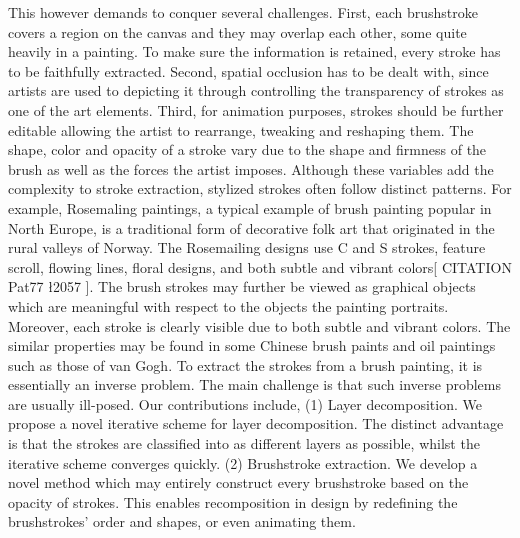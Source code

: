 This however demands to conquer several challenges. First, each brushstroke covers a region on the canvas and they may overlap each other, some quite heavily in a painting. To make sure the information is retained, every stroke has to be faithfully extracted. Second, spatial occlusion has to be dealt with, since artists are used to depicting it through controlling the transparency of strokes as one of the art elements. Third, for animation purposes, strokes should be further editable allowing the artist to rearrange, tweaking and reshaping them.
The shape, color and opacity of a stroke vary due to the shape and firmness of the brush as well as the forces the artist imposes. Although these variables add the complexity to stroke extraction, stylized strokes often follow distinct patterns. For example, Rosemaling paintings, a typical example of brush painting popular in North Europe, is a traditional form of decorative folk art that originated in the rural valleys of Norway. The Rosemailing designs use C and S strokes, feature scroll, flowing lines, floral designs, and both subtle and vibrant colors[ CITATION Pat77 \l 2057 ]. The brush strokes may further be viewed as graphical objects which are meaningful with respect to the objects the painting portraits. Moreover, each stroke is clearly visible due to both subtle and vibrant colors. The similar properties may be found in some Chinese brush paints and oil paintings such as those of van Gogh.
To extract the strokes from a brush painting, it is essentially an inverse problem. The main challenge is that such inverse problems are usually ill-posed. Our contributions include,
(1) Layer decomposition. We propose a novel iterative scheme for layer decomposition. The distinct advantage is that the strokes are classified into as different layers as possible, whilst the iterative scheme converges quickly.
(2) Brushstroke extraction. We develop a novel method which may entirely construct every brushstroke based on the opacity of strokes. This enables recomposition in design by redefining the brushstrokes’ order and shapes, or even animating them.